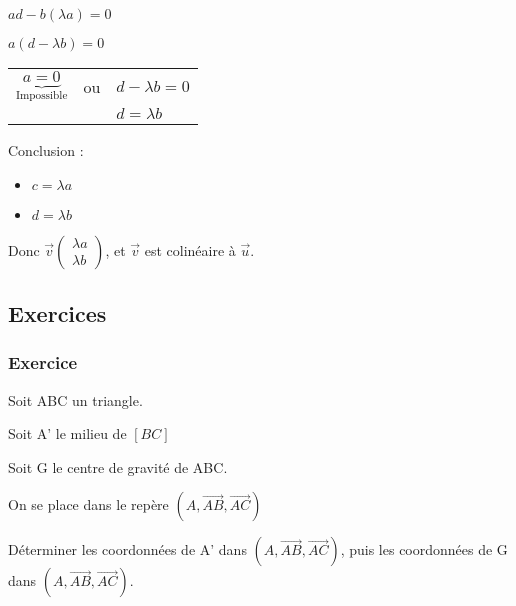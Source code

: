 $ad - b\left(\lambda a \right) = 0 $

$ a \left( d - \lambda b\right) = 0 $ \\

\begin{tabular}{lll}
$ \underbrace{a = 0}_{\textrm{Impossible}}$ & ou & $d - \lambda b = 0$ \\
 & & $ d = \lambda b $ \\
  
\end{tabular}

Conclusion :

\begin{itemize}
\item $ c = \lambda a $
\item $ d = \lambda b$
\end{itemize}

Donc $\vec{v}\left(\begin{array}{c} \lambda a\\ \lambda b \end{array}\right)$, et $\vec{v}$ est colinéaire à $\vec{u}$.
\newpage
\subsection{Exercices}

\subsubsection{Exercice }

Soit ABC un triangle.

Soit A' le milieu de $\left[BC\right]$

Soit G le centre de gravité de ABC.

On se place dans le repère $\left(A, \overrightarrow{AB}, \overrightarrow{AC}\right)$

Déterminer les coordonnées de A' dans $\left(A, \overrightarrow{AB}, \overrightarrow{AC}\right)$, puis les coordonnées de G dans $\left(A, \overrightarrow{AB}, \overrightarrow{AC}\right)$.\\

\\

